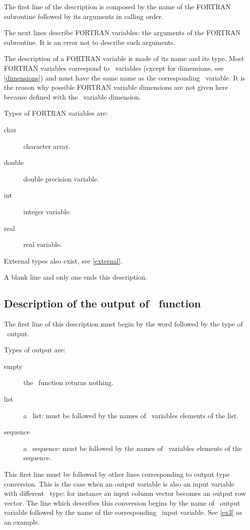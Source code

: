 The first line of the description is composed by the name of the 
FORTRAN subroutine
followed by its arguments in calling order.

The next lines describe FORTRAN variables: the arguments of the FORTRAN
subroutine. 
It is an error not to describe such arguments.

The description of a FORTRAN variable is made of its name and its type.
Most FORTRAN variables correspond to \SCI\ variables (except for
dimensions, see \ref{dimensions}) and must have the same name as the
corresponding \SCI\ variable. It is the reason why possible FORTRAN variable
dimensions are not given here because defined with the \SCI\ variable
dimension.

\smallskip

Types of FORTRAN variables are:
\begin{description}
  \item[char] character array.
  \item[double] double precision variable.
  \item[int] integer variable.
  \item[real] real variable.
\end{description}

External types also exist, see \ref{external}.

\smallskip

A blank line and only one ends this description.

\subsection{Description of the output of \SCI\ function}
\label{output}

The first line of this description must begin by the word  followed
by the type of \SCI\ output.

\smallskip

Types of output are:
\begin{description}
  \item[empty] the \SCI\ function returns nothing.
  \item[list] a \SCI\ list: must be followed by the names of \SCI\ variables
elements of the list.
  \item[sequence] a \SCI\ sequence: must be followed by the names of \SCI\
variables elements of the sequence.
\end{description}

This first line must be followed by other lines corresponding to output type
conversion. This is the case when an output variable is also an input variable
with different \SCI\ type: for instance an input column vector becomes an
output row vector. The line which describes this conversion begins by the name
of \SCI\ output variable followed by the name of the corresponding \SCI\ input
variable. See \ref{ex3} as an example.
\medskip

